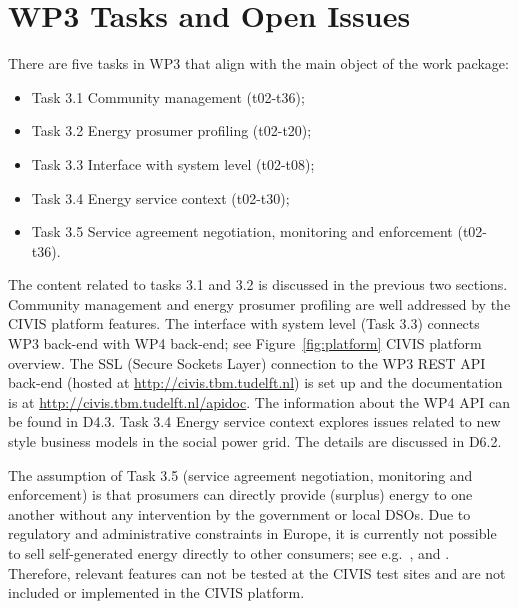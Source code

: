

\section{WP3 Tasks and Open Issues} 

There are five tasks in WP3 that align with the main object of the work package: 
\begin{itemize}
\item Task 3.1 Community management (t02-t36); 
\item Task 3.2 Energy prosumer profiling (t02-t20); 
\item Task 3.3 Interface with system level (t02-t08); 
\item Task 3.4 Energy service context (t02-t30); 
\item Task 3.5 Service agreement negotiation, monitoring and enforcement (t02-t36). 
\end{itemize}

The content related to tasks 3.1 and 3.2 is discussed in the previous two sections. Community management and energy prosumer profiling are well addressed by the CIVIS platform features. The interface with system level (Task 3.3) connects WP3 back-end with WP4 back-end; see Figure~\ref{fig:platform} CIVIS platform overview. The SSL (Secure Sockets Layer) connection to the WP3 REST API back-end (hosted at {\small \url{http://civis.tbm.tudelft.nl}}) is set up and the documentation is at  {\small \url{http://civis.tbm.tudelft.nl/apidoc}}. The information about the WP4 API can be found in D4.3. 
Task 3.4 Energy service context explores issues related to new style business models in the social power grid. The details are discussed in D6.2. 

The assumption of Task 3.5 (service agreement negotiation, monitoring and enforcement) is that prosumers can directly provide (surplus) energy to one another without any intervention by the government or local DSOs. 
Due to regulatory and administrative constraints in Europe, it is currently not possible to sell
self-generated energy directly to other consumers; see
e.g.~\cite{agentschap2012zonnestroom}, \cite{menges2003supporting} and \cite{anaya2015integrating}.
Therefore, relevant features can not be tested at the CIVIS test sites and are not included or implemented in the CIVIS platform. 

